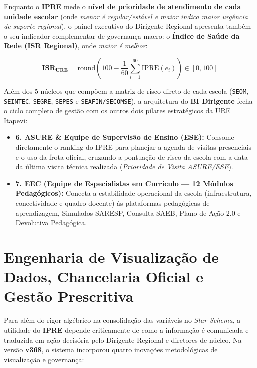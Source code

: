 \documentclass[9pt,a4paper]{extarticle}
\begin{document}
Enquanto o \textbf{IPRE} mede o \textbf{nível de prioridade de atendimento de cada unidade escolar} (onde \emph{menor é regular/estável e maior indica maior urgência de suporte regional}), o painel executivo do Dirigente Regional apresenta também o seu indicador complementar de governança macro: o \textbf{Índice de Saúde da Rede (ISR Regional)}, onde \emph{maior é melhor}:

\begin{equation}
\mathbf{\text{ISR}_{\text{URE}}} = \text{round}\left(100 - \frac{1}{60}\sum_{i=1}^{60} \text{IPRE}(e_i)\right) \in [0, 100]
\end{equation}

Além dos $5$ núcleos que compõem a matriz de risco direto de cada escola (\texttt{SEOM}, \texttt{SEINTEC}, \texttt{SEGRE}, \texttt{SEPES} e \texttt{SEAFIN/SECOMSE}), a arquitetura do \textbf{BI Dirigente} fecha o ciclo completo de gestão com os outros dois pilares estratégicos da URE Itapevi:
\begin{itemize}[leftmargin=1.5em, itemsep=3pt]
    \item \textbf{6. ASURE \& Equipe de Supervisão de Ensino (ESE):} Consome diretamente o ranking do IPRE para planejar a agenda de visitas presenciais e o uso da frota oficial, cruzando a pontuação de risco da escola com a data da última visita técnica realizada (\emph{Prioridade de Visita ASURE/ESE}).
    \item \textbf{7. EEC (Equipe de Especialistas em Currículo --- 12 Módulos Pedagógicos):} Conecta a estabilidade operacional da escola (infraestrutura, conectividade e quadro docente) às plataformas pedagógicas de aprendizagem, Simulados SARESP, Consulta SAEB, Plano de Ação 2.0 e Devolutiva Pedagógica.
\end{itemize}

\section{Engenharia de Visualização de Dados, Chancelaria Oficial e Gestão Prescritiva}

Para além do rigor algébrico na consolidação das variáveis no \emph{Star Schema}, a utilidade do \textbf{IPRE} depende criticamente de como a informação é comunicada e traduzida em ação decisória pelo Dirigente Regional e diretores de núcleo. Na versão \textbf{v368}, o sistema incorporou quatro inovações metodológicas de visualização e governança:
\end{document}
